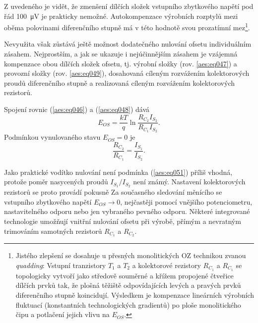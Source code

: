         Z uvedeného je vidět, že zmenšení dílčích složek vstupního zbytkového napětí pod řád
        \qty{100}{\uV} je prakticky nemožné. Autokompenzace výrobních rozptylů mezi oběma polovinami
        diferenčního stupně má v této hodnotě svou prozatímní mez\footnote{Jistého zlepšení se
        dosahuje u přesných monolitických OZ technikou zvanou \emph{quadding}: Vstupní tranzistory
        \(T_1\) a \(T_2\) a kolektorové rezistory \(R_{C_1}\) a \(R_{C_1}\) se topologicky vytvoří
        jako středově souměrné a křížem propojené čtveřice dílčích prvků tak, že plošná těžiště
        odpovídajících levých a pravých prvků diferenčního stupně koincidují. Výsledkem je
        kompenzace lineárních výrobních fluktuací (konstantních technologických gradientů) po ploše
        monolitického čipu a potlačení jejich vlivu na \(E_{OS}\).}.

        Nevyužita však zůstává ještě možnost dodatečného nulování ofsetu individuálním zásahem.
        Nejprostším, a jak se ukazuje i nejúčinnějším zásahem je vzájemná kompenzace obou dílčích
        složek ofsetu, tj. výrobní složky (rov. \ref{aes:eq047}) a provozní složky (rov.
        \ref{aes:eq049}), dosahovaná cíleným rozvážením kolektorových proudů diferenčního stupně a
        realizovaná cíleným rozvážením kolektorových rezistorů.

        Spojení rovnic (\ref{aes:eq046}) a (\ref{aes:eq048}) dává
        \begin{equation}\label{aes:eq050}
          E_{OS} = \dfrac{kT}{q}\ln\dfrac{R_{C_2}I_{S_2}}{R_{C_1}I_{S_2}}.
        \end{equation}
        Podmínkou vynulovaného stavu \(E_{OS} = 0\) je
        \begin{equation}\label{aes:eq051} 
          \dfrac{R_{C_2}}{R_{C_1}} = \dfrac{I_{S_1}}{I_{S_2}}.
        \end{equation}

        Jako praktické vodítko nulování není podmínka (\ref{aes:eq051}) příliš vhodná, protože
        poměr nasycených proudů \(I_{S_1}/I_{S_2}\) není známý. Nastavení kolektorových rezistorů
        se proto provádí pokusně Za současného sledování měnícího se vstupního zbytkového napětí
        \(E_{OS}\rightarrow0\), nejčastěji pomocí vnějšího potenciometru, nastavitelného odporu nebo
        jen vybraného pevného odporu. Některé integrované technologie umožňují vnitřní nulování
        ofsetu při výrobě, přímým a nevratným trimováním samotných rezistorů \(R_{C_1}\) a
        \(R_{C_2}\).
        
